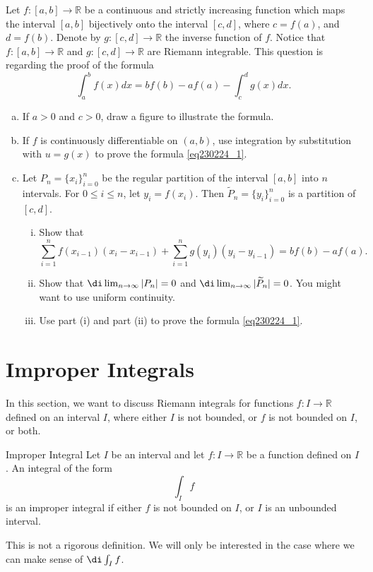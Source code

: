 \begin{example}[label=20230527]{}
 \atc
\begin{question}{\themyquestion}
 Let $f:[a,b]\to\mathbb{R}$ be a continuous and strictly increasing function which maps the interval $[a,b]$ bijectively onto the interval $[c,d]$, where $c=f(a)$, and $d=f(b)$. Denote by $g:[c,d]\to\mathbb{R}$  the inverse function of $f$. Notice that  $f:[a,b]\to\mathbb{R}$ and $g:[c,d]\to\mathbb{R}$ are Riemann integrable. This question is regarding the proof of the formula
\begin{equation}\label{eq230224_1}\int_a^bf(x)dx=bf(b)-af(a)-\int_c^dg(x)dx.\end{equation}
 \begin{enumerate}[(a)]
\item If $a>0$ and $c>0$,  draw a figure to illustrate  the formula.
\item If $f$ is continuously differentiable on $(a,b)$,  
use integration by substitution with $u=g(x)$ to prove the formula \eqref{eq230224_1}.

 \item  Let $P_n=\{x_i\}_{i=0}^n$ be the regular partition of the interval $[a,b]$ into $n$ intervals. For $0\leq i\leq n$, let $y_i=f(x_i)$. Then $\widetilde{P}_n=\{y_i\}_{i=0}^n$ is a partition of $[c,d]$. 
\begin{enumerate}[(i)]
\item
Show that \[\sum_{i=1}^n f(x_{i-1})(x_i-x_{i-1})+\sum_{i=1}^n g(y_i)(y_i-y_{i-1})=bf(b)-af(a).\]
\item Show that $\di\lim_{n\to\infty}|P_n|=0$ and  $\di\lim_{n\to\infty}|\widetilde{P}_n|=0$. You might want to use uniform continuity.
\item Use part (i) and part (ii) to prove the formula
 \eqref{eq230224_1}.
\end{enumerate}
\end{enumerate}
\end{question}
\vp



\section{Improper Integrals}\label{sec4.6}
In this section, we want to discuss Riemann integrals for functions $f:I\to\mathbb{R}$ defined on an interval $I$, where either $I$ is not bounded, or $f$ is not bounded on $I$, or both. 

\begin{definition}{Improper Integral}
Let $I$ be an interval and let  $f:I\to\mathbb{R}$ be a function defined on $I$.  An integral of the form
\[\int_If\] is an improper integral if either $f$ is not bounded on $I$, or $I$ is an unbounded interval.
\end{definition}
This is not a rigorous definition. We will only be interested in the case where we can make sense of $\di\int_If$.


\end{example}
